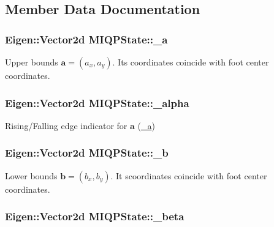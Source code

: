 \subsection{\-Member \-Data \-Documentation}
\hypertarget{classMIQPState_a2977495d57c42885d5463996dd8397fa}{
\subsubsection[{\-\_\-a}]{\setlength{\rightskip}{0pt plus 5cm}\-Eigen\-::\-Vector2d {\bf \-M\-I\-Q\-P\-State\-::\-\_\-a}}}\label{classMIQPState_a2977495d57c42885d5463996dd8397fa}
\-Upper bounds $\mathbf{a} = (a_x, a_y)$. \-Its coordinates coincide with foot center coordinates. \hypertarget{classMIQPState_a8eca5349734a0289a02228d1c31aab59}{
\subsubsection[{\-\_\-alpha}]{\setlength{\rightskip}{0pt plus 5cm}\-Eigen\-::\-Vector2d {\bf \-M\-I\-Q\-P\-State\-::\-\_\-alpha}}}\label{classMIQPState_a8eca5349734a0289a02228d1c31aab59}
\-Rising/\-Falling edge indicator for $\mathbf{a}$ (\hyperlink{classMIQPState_a2977495d57c42885d5463996dd8397fa}{\-\_\-a}) \hypertarget{classMIQPState_ae887a41c5a843a6ed534b33a78749a16}{
\subsubsection[{\-\_\-b}]{\setlength{\rightskip}{0pt plus 5cm}\-Eigen\-::\-Vector2d {\bf \-M\-I\-Q\-P\-State\-::\-\_\-b}}}\label{classMIQPState_ae887a41c5a843a6ed534b33a78749a16}
\-Lower bounds $\mathbf{b} = (b_x, b_y)$. \-It scoordinates coincide with foot center coordinates. \hypertarget{classMIQPState_aa590ce01a7f43336bf636c9efd6a72c2}{
\subsubsection[{\-\_\-beta}]{\setlength{\rightskip}{0pt plus 5cm}\-Eigen\-::\-Vector2d {\bf \-M\-I\-Q\-P\-State\-::\-\_\-beta}}}\label{classMIQPState_aa590ce01a7f43336bf636c9efd6a72c2}
